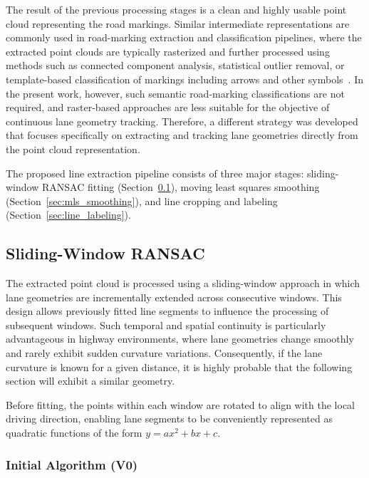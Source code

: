 The result of the previous processing stages is a clean and highly usable point cloud representing the road markings. Similar intermediate representations are commonly used in road-marking extraction and classification pipelines, where the extracted point clouds are typically rasterized and further processed using methods such as connected component analysis, statistical outlier removal, or template-based classification of markings including arrows and other symbols~\cite{isprs-archives-XLII-2-W13-1089-2019}. In the present work, however, such semantic road-marking classifications are not required, and raster-based approaches are less suitable for the objective of continuous lane geometry tracking. Therefore, a different strategy was developed that focuses specifically on extracting and tracking lane geometries directly from the point cloud representation.

The proposed line extraction pipeline consists of three major stages: sliding-window RANSAC fitting (Section~\ref{sec:sliding_ransac}), moving least squares smoothing (Section~\ref{sec:mls_smoothing}), and line cropping and labeling (Section~\ref{sec:line_labeling}).

\FloatBarrier
\subsection{Sliding-Window RANSAC}
\label{sec:sliding_ransac}

The extracted point cloud is processed using a sliding-window approach in which lane geometries are incrementally extended across consecutive windows. This design allows previously fitted line segments to influence the processing of subsequent windows. Such temporal and spatial continuity is particularly advantageous in highway environments, where lane geometries change smoothly and rarely exhibit sudden curvature variations. Consequently, if the lane curvature is known for a given distance, it is highly probable that the following section will exhibit a similar geometry.

Before fitting, the points within each window are rotated to align with the local driving direction, enabling lane segments to be conveniently represented as quadratic functions of the form $y = ax^2 + bx + c$.

\FloatBarrier
\subsubsection{Initial Algorithm (V0)}
\label{sec:ransac_v0}

